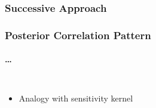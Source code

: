 \documentclass[aspectratio=169, t, 10pt]{beamer}
\begin{document}
\begin{frame}
    \frametitle{Successive Approach}
    \begin{center}
    \end{center}
\end{frame}


\begin{frame}
    \frametitle{Posterior Correlation Pattern}
    \framesubtitle{\dots }

\begin{columns}
%
    \begin{itemize}
        \item Analogy with sensitivity kernel
    \end{itemize}

    \vspace{-10mm}

\end{columns}

\end{frame}
\end{document}
